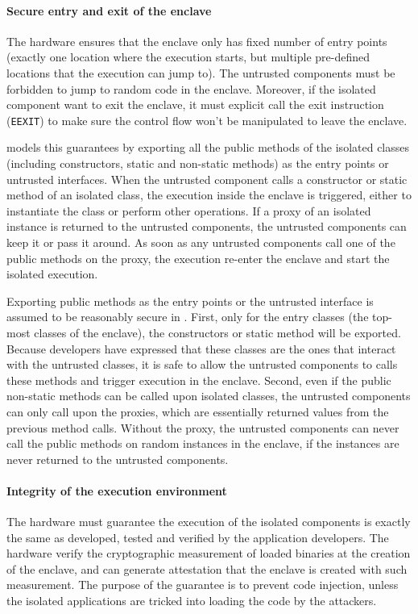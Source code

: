 \paragraph{Secure entry and exit of the enclave}
The \sgx{} hardware ensures that the enclave only has fixed number of entry points (exactly one location where the execution starts, but multiple pre-defined locations that the execution can jump to). 
The untrusted components must be forbidden to jump to random code in the enclave.
Moreover, if the isolated component want to exit the enclave,
it must explicit call the exit instruction ({\tt EEXIT}) to make sure
the control flow won't be manipulated to leave the enclave.

\sysname{} models this guarantees by exporting all the public methods of the isolated classes
(including constructors, static and non-static methods) as the entry points or untrusted interfaces.
When the untrusted component calls a constructor or static method of an isolated class,
the execution inside the enclave is triggered,
either to instantiate the class or perform other operations.
If a proxy of an isolated instance is returned to the untrusted components,
the untrusted components can keep it or pass it around.
As soon as any untrusted components call one of the public methods on the proxy, the execution re-enter the enclave and start the isolated execution.

Exporting public methods as the entry points or the untrusted interface
is assumed to be reasonably secure in \sysname{}.
First, only for the entry classes (the top-most classes of the enclave),
the constructors or static method will be exported.
Because developers have expressed that these classes are the ones that interact with the untrusted classes, it is safe to allow the untrusted components to calls these methods and trigger execution in the enclave.
Second, even if the public non-static methods can be called
upon isolated classes, the untrusted components can only call upon the proxies,
which are essentially returned values from the previous method calls.
Without the proxy, the untrusted components can never call the public methods
on random instances in the enclave, if the instances are never returned to the untrusted components.

\paragraph{Integrity of the execution environment}
The \sgx{} hardware must guarantee the execution of the isolated components
is exactly the same as developed, tested and verified by the application developers.
The \sgx{} hardware verify the cryptographic measurement of loaded binaries
at the creation of the enclave,
and can generate attestation that the enclave is created with such measurement.
The purpose of the guarantee is to prevent code injection,
unless the isolated applications are tricked into loading the code by the attackers.

